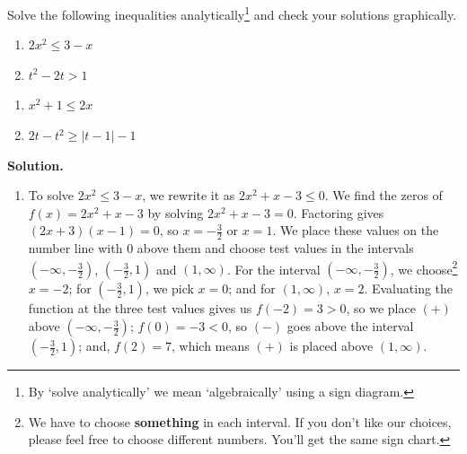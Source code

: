 \documentclass{ximera}
\begin{document}
\begin{ex}  Solve the following inequalities analytically\footnote{By `solve analytically' we mean `algebraically' using a sign diagram.} and check your solutions graphically.

\begin{multicols}{2}
\begin{enumerate}

\item  $2x^2 \leq 3-x$

\item  $t^2 - 2t > 1$

\setcounter{HW}{\value{enumi}}
\end{enumerate}
\end{multicols}

\begin{multicols}{2}
\begin{enumerate}
\setcounter{enumi}{\value{HW}}

\item  $x^2+1 \leq 2x$

\item  $2t-t^2 \geq |t-1|-1$

\end{enumerate}
\end{multicols}

{\bf Solution.}  

\begin{enumerate}

\item  To solve $2x^2 \leq 3-x$, we rewrite it as $2x^2+x-3 \leq 0$.  We find the zeros of $f(x) = 2x^2 + x - 3$ by solving $2x^2 + x - 3 = 0$.  Factoring gives $(2x+3)(x-1)=0$, so $x = -\frac{3}{2}$ or $x = 1$.  We place these values on the number line with $0$ above them and choose test values in the intervals $\left(-\infty, -\frac{3}{2}\right)$, $\left(-\frac{3}{2},1\right)$ and $(1,\infty)$.  For the interval  $\left(-\infty, -\frac{3}{2}\right)$, we choose\footnote{We have to choose \textbf{something} in each interval.  If you don't like our choices, please feel free to choose different numbers.  You'll get the same sign chart.} $x=-2$; for $\left(-\frac{3}{2},1\right)$, we pick $x=0$; and for $(1,\infty)$, $x=2$. Evaluating the function at the three test values gives us $f(-2) = 3 > 0$, so we place $(+)$ above $\left(-\infty, -\frac{3}{2}\right)$;  $f(0)=-3 < 0$, so $(-)$ goes above the interval $\left(-\frac{3}{2},1\right)$;  and, $f(2) = 7$, which means $(+)$ is placed above $(1,\infty)$.


\end{enumerate}
\end{ex}
\end{document}
